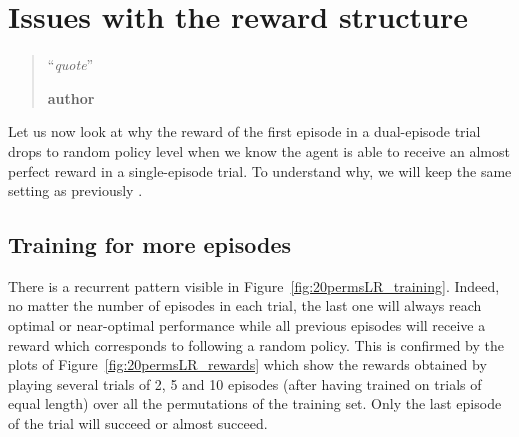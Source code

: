 \chapter{Issues with the reward structure}
\label{chap:reward_structure}
\begin{quotation}
\noindent ``\emph{quote}''
\begin{flushright}\textbf{author}\end{flushright}
\end{quotation}

Let us now look at why the reward of the first episode in a dual-episode
trial drops to random policy level when we know the agent is able to receive
an almost perfect reward in a single-episode trial. To understand why, we will
keep the same setting as previously .

\section{Training for more episodes}
There is a recurrent pattern visible in Figure~\ref{fig:20permsLR_training}.
Indeed, no matter the number of episodes in each trial, the last one will
always reach optimal or near-optimal performance while all previous episodes
will receive a reward which corresponds to following a random policy.
This is confirmed by the plots of Figure~\ref{fig:20permsLR_rewards} which
show the rewards obtained by playing several trials of 2, 5 and 10 episodes
(after having trained on trials of equal length) over all the permutations of
the training set. Only the last episode of the trial will succeed or almost
succeed.

